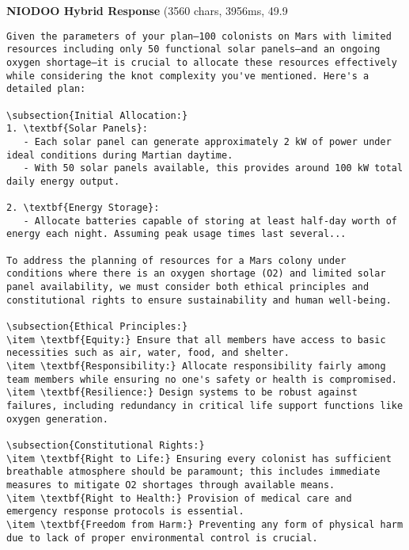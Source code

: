 \documentclass[11pt,a4paper]{article}
\begin{document}
\textbf{NIODOO Hybrid Response} (3560 chars, 3956ms, 49.9%
\begin{verbatim}Given the parameters of your plan—100 colonists on Mars with limited resources including only 50 functional solar panels—and an ongoing oxygen shortage—it is crucial to allocate these resources effectively while considering the knot complexity you've mentioned. Here's a detailed plan:

\subsection{Initial Allocation:}
1. \textbf{Solar Panels}:
   - Each solar panel can generate approximately 2 kW of power under ideal conditions during Martian daytime.
   - With 50 solar panels available, this provides around 100 kW total daily energy output.
   
2. \textbf{Energy Storage}:
   - Allocate batteries capable of storing at least half-day worth of energy each night. Assuming peak usage times last several...

To address the planning of resources for a Mars colony under conditions where there is an oxygen shortage (O2) and limited solar panel availability, we must consider both ethical principles and constitutional rights to ensure sustainability and human well-being.

\subsection{Ethical Principles:}
\item \textbf{Equity:} Ensure that all members have access to basic necessities such as air, water, food, and shelter.
\item \textbf{Responsibility:} Allocate responsibility fairly among team members while ensuring no one's safety or health is compromised.
\item \textbf{Resilience:} Design systems to be robust against failures, including redundancy in critical life support functions like oxygen generation.

\subsection{Constitutional Rights:}
\item \textbf{Right to Life:} Ensuring every colonist has sufficient breathable atmosphere should be paramount; this includes immediate measures to mitigate O2 shortages through available means.
\item \textbf{Right to Health:} Provision of medical care and emergency response protocols is essential.
\item \textbf{Freedom from Harm:} Preventing any form of physical harm due to lack of proper environmental control is crucial.


\end{verbatim}
\end{document}
